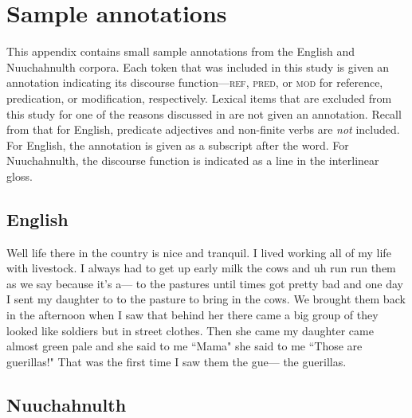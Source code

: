 \chapter{Sample annotations}
\label{app:sample-annotations}

This appendix contains small sample annotations from the English and Nuuchahnulth corpora. Each token that was included in this study is given an annotation indicating its discourse function—\textsc{ref}, \textsc{pred}, or \textsc{mod} for reference, predication, or modification, respectively. Lexical items that are excluded from this study for one of the reasons discussed in  are not given an annotation. Recall from  that for English, predicate adjectives and non-finite verbs are \emph{not} included. For English, the annotation is given as a subscript after the word. For Nuuchahnulth, the discourse function is indicated as a  line in the interlinear gloss.

\section{English}
\label{app:sample-annotations-English}

\onehalfspacing

Well life there in the country is nice and tranquil. I lived working all of my life with livestock. I always had to get up early milk the cows and uh run run them as we say because it's a— to the pastures until times got pretty bad and one day I sent my daughter to to the pasture to bring in the cows. We brought them back in the afternoon when I saw that behind her there came a big group of they looked like soldiers but in street clothes. Then she came my daughter came almost green pale and she said to me ``Mama" she said to me ``Those are guerillas!" That was the first time I saw them the gue— the guerillas. \parencite[ArguetaBertila-ENG]{OANC}

\section{Nuuchahnulth}
\label{app:sample-annotations-Nuuchahnulth}

